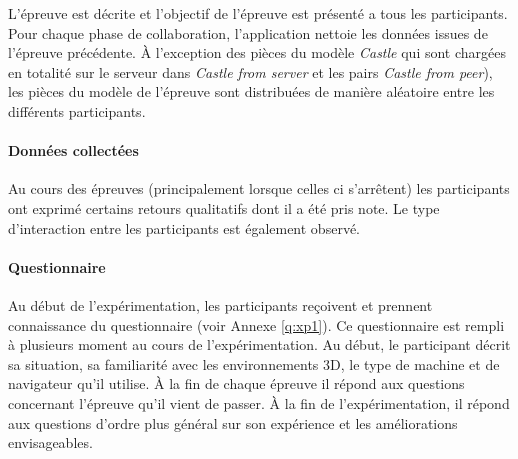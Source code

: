 L'épreuve est décrite et l'objectif de l'épreuve est présenté a tous les participants.
Pour chaque phase de collaboration, l'application nettoie les données issues de 
l'épreuve précédente. 
À l'exception des pièces du modèle \textit{Castle} qui sont chargées
en totalité sur le serveur dans \textit{Castle from server} et les pairs \textit{Castle 
from peer}), les pièces du modèle de l'épreuve sont distribuées de manière 
aléatoire entre les différents participants.

\paragraph{Données collectées}
Au cours des épreuves (principalement lorsque celles ci s'arrêtent)  les 
participants ont exprimé certains retours qualitatifs dont il a été pris note. Le type 
d'interaction entre les participants est également observé.

\paragraph{Questionnaire}
Au début de l'expérimentation, les participants reçoivent et prennent connaissance 
du questionnaire (voir Annexe \ref{q:xp1}). Ce questionnaire est rempli à plusieurs 
moment au cours de l'expérimentation. Au début, le participant décrit sa situation, 
sa familiarité avec les environnements \gls{3D}, le type de machine et de 
navigateur 
qu'il utilise. À la fin de chaque épreuve il répond aux questions concernant 
l'épreuve qu'il vient de passer. À la fin de l'expérimentation, il répond aux 
questions d'ordre plus général sur son expérience et les améliorations 
envisageables.
